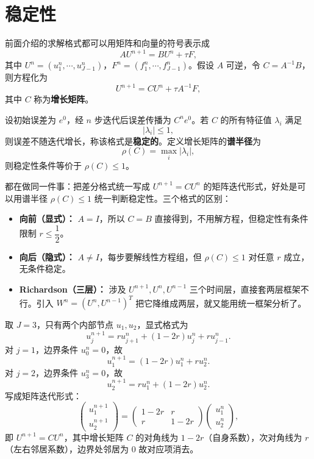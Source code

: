 \chapter{稳定性}
\begin{definition}[稳定性]
前面介绍的求解格式都可以用矩阵和向量的符号表示成
$$
AU^{n+1} = BU^n + \tau F,
$$
其中 $U^n = (u_1^n,\cdots,u_{J-1}^n)$，$F^n = (f_1^n,\cdots,f_{J-1}^n)$。假设 $A$ 可逆，令 $C = A^{-1}B$，则方程化为
$$
U^{n+1} = CU^n + \tau A^{-1}F,
$$
其中 $C$ 称为\textbf{增长矩阵}。

设初始误差为 $e^0$，经 $n$ 步迭代后误差传播为 $C^n e^0$。若 $C$ 的所有特征值 $\lambda_i$ 满足
$$
|\lambda_i| \leq 1,
$$
则误差不随迭代增长，称该格式是\textbf{稳定的}。定义增长矩阵的\textbf{谱半径}为
$$
\rho(C) = \max_i |\lambda_i|,
$$
则稳定性条件等价于 $\rho(C) \leq 1$。
\end{definition}
\begin{note}
都在做同一件事：把差分格式统一写成 $U^{n+1} = CU^n$ 的矩阵迭代形式，好处是可以用谱半径 $\rho(C) \leq 1$ 统一判断稳定性。三个格式的区别：
\begin{itemize}
    \item \textbf{向前（显式）：} $A=I$，所以 $C=B$ 直接得到，不用解方程，但稳定性有条件限制 $r \leq \dfrac{1}{2}$。
    \item \textbf{向后（隐式）：} $A \neq I$，每步要解线性方程组，但 $\rho(C) \leq 1$ 对任意 $r$ 成立，无条件稳定。
    \item \textbf{Richardson（三层）：} 涉及 $U^{n+1}, U^n, U^{n-1}$ 三个时间层，直接套两层框架不行。引入 $W^n = (U^n, U^{n-1})^T$ 把它降维成两层，就又能用统一框架分析了。
\end{itemize}
\end{note}
\begin{example}
取 $J=3$，只有两个内部节点 $u_1, u_2$，显式格式为
$$
u_j^{n+1} = ru_{j+1}^n + (1-2r)u_j^n + ru_{j-1}^n.
$$
对 $j=1$，边界条件 $u_0^n = 0$，故
$$
u_1^{n+1} = (1-2r)u_1^n + ru_2^n.
$$
对 $j=2$，边界条件 $u_3^n = 0$，故
$$
u_2^{n+1} = ru_1^n + (1-2r)u_2^n.
$$
写成矩阵迭代形式：
$$
\begin{pmatrix} u_1^{n+1} \\ u_2^{n+1} \end{pmatrix} = \begin{pmatrix} 1-2r & r \\ r & 1-2r \end{pmatrix} \begin{pmatrix} u_1^n \\ u_2^n \end{pmatrix},
$$
即 $U^{n+1} = CU^n$，其中增长矩阵 $C$ 的对角线为 $1-2r$（自身系数），次对角线为 $r$（左右邻居系数），边界处邻居为 $0$ 故对应项消去。
\end{example}
